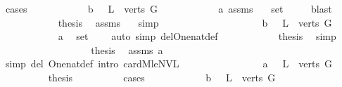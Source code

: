 \begin{isabellebody}
\ cases\isanewline
\ \ \ \ \ \ \ \ \ \ \isamarkupfalse%
\ b{\isacharcolon}\ {\isachardoublequoteopen}{}\ {\isasymin}\ L\ {\isacharbackquote}\ verts\ G{\isachardoublequoteclose}\isanewline
\ \ \ \ \ \ \ \ \ \ \isamarkupfalse%
\ a\ assms\ \isamarkupfalse%
\ \ {\isachardoublequoteopen}{\isacharquery}set{}{}\ {\isacharequal}\ {\isacharbraceleft}{}{\isacharcomma}\ {}{\isacharbraceright}{\isachardoublequoteclose}\ \isamarkupfalse%
\ blast\isanewline
\ \ \ \ \ \ \ \ \ \ \isamarkupfalse%
\ {\isacharquery}thesis\ \isamarkupfalse%
\ assms\ {}\ \isamarkupfalse%
\ simp\isanewline
\ \ \ \ \ \ \ \ \isamarkupfalse%
\isanewline
\ \ \ \ \ \ \ \ \ \ \isamarkupfalse%
\ b{\isacharcolon}\ {\isachardoublequoteopen}{}\ {\isasymnotin}\ L\ {\isacharbackquote}\ verts\ G{\isachardoublequoteclose}\isanewline
\ \ \ \ \ \ \ \ \ \ \isamarkupfalse%
\ a\ \isamarkupfalse%
\ {\isachardoublequoteopen}{\isacharquery}set{}{}\ {\isacharequal}\ {\isacharbraceleft}{}{\isacharbraceright}{\isachardoublequoteclose}\ \isamarkupfalse%
\ {\isacharparenleft}auto\ simp\ del{\isacharcolon}One{\isacharunderscore}nat{\isacharunderscore}def{\isacharparenright}\isanewline
\ \ \ \ \ \ \ \ \ \ \isamarkupfalse%
\ {\isacharquery}thesis\ \isamarkupfalse%
\ simp\isanewline
\ \ \ \ \ \ \ \ \isamarkupfalse%
\isanewline
\ \ \ \ \ \ \ \ \isamarkupfalse%
\ {\isacharquery}thesis\ \isamarkupfalse%
\ assms\ a\ \isanewline
\ \ \ \ \ \ \ \ \ \ \isamarkupfalse%
\ {\isacharparenleft}simp\ del{\isacharcolon}\ One{\isacharunderscore}nat{\isacharunderscore}def{\isacharcomma}\ intro\ card{\isacharunderscore}M{}{\isacharunderscore}le{\isacharunderscore}NVL{}{\isacharparenright}\isanewline
\ \ \ \ \ \ \isamarkupfalse%
\isanewline
\ \ \ \ \ \ \ \ \isamarkupfalse%
\ a{\isacharcolon}\ {\isachardoublequoteopen}{}\ {\isasymnotin}\ L\ {\isacharbackquote}\ verts\ G{\isachardoublequoteclose}\isanewline
\ \ \ \ \ \ \ \ \isamarkupfalse%
\ {\isacharquery}thesis\isanewline
\ \ \ \ \ \ \ \ \isamarkupfalse%
\ cases\isanewline
\ \ \ \ \ \ \ \ \ \ \isamarkupfalse%
\ b{\isacharcolon}\ {\isachardoublequoteopen}{}\ {\isasymin}\ L\ {\isacharbackquote}\ verts\ G{\isachardoublequoteclose}\isanewline

\end{isabellebody}
